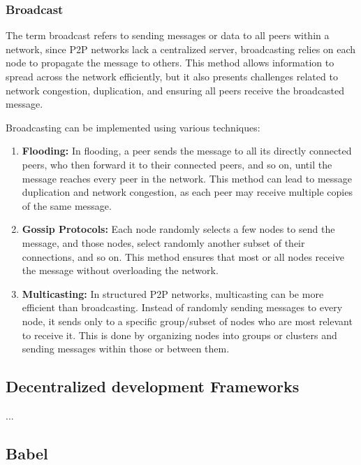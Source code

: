 \subsubsection{Broadcast}
\label{sec:Broadcast}

The term broadcast refers to sending messages or data to all peers within a network, since \gls{P2P} networks lack a centralized server, broadcasting relies on each node to propagate the message to others.
This method allows information to spread across the network efficiently, but it also presents challenges related to network congestion, duplication, and ensuring all peers receive the broadcasted message.

Broadcasting can be implemented using various techniques:

\begin{enumerate}

  \item \textbf{Flooding:} In flooding, a peer sends the message to all its directly connected peers, who then forward it to their connected peers, and so on, until the message reaches every peer in the network. This method can lead to message duplication and network congestion, as each peer may receive multiple copies of the same message.
  \item \textbf{Gossip Protocols:} Each node randomly selects a few nodes to send the message, and those nodes, select randomly another subset of their connections, and so on. This method ensures that most or all nodes receive the message without overloading the network.
  \item \textbf{Multicasting:} In structured \gls{P2P} networks, multicasting can be more efficient than broadcasting. Instead of randomly sending messages to every node, it sends only to a specific group/subset of nodes who are most relevant to receive it. This is done by organizing nodes into groups or clusters and sending messages within those or between them.

\end{enumerate}



\subsection{Decentralized development Frameworks}
\label{sub:decentralized_development_frameworks}

...

\subsection{Babel}
\label{sub:babel}

